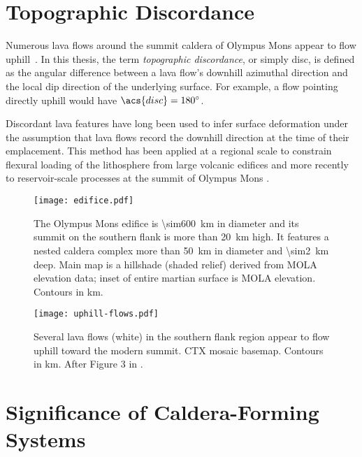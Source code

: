 \section{Topographic Discordance}

Numerous lava flows around the summit caldera of Olympus Mons appear to flow uphill~\parencite[Figure~\ref{fig:uphill-flows}; after][]{mouginis-mark_late-stage_2019}. In this thesis, the term \emph{topographic discordance}, or simply \ac{disc}, is defined as the angular difference between a lava flow's downhill azimuthal direction and the local dip direction of the underlying surface. For example, a flow pointing directly uphill would have $\acs{disc}=\ang{180}$. 

Discordant lava features have long been used to infer surface deformation under the assumption that lava flows record the downhill direction at the time of their emplacement. This method has been applied at a regional scale to constrain flexural loading of the lithosphere from large volcanic edifices \parencite{mouginis-mark_ancient_1982,isherwood_volcanic_2013,chadwick_late_2015} and more recently to reservoir-scale processes at the summit of Olympus Mons \parencite{mouginis-mark_late-stage_2019}.

\begin{figure}
    \centering
    \texttt{[image: edifice.pdf]}
    \caption[Olympus Mons]{The Olympus Mons edifice is \qty{\sim600}{\km} in diameter and its summit on the southern flank is more than \qty{20}{\km} high. It features a nested caldera complex more than \qty{50}{\km} in diameter and \qty{\sim2}{\km} deep. Main map is a hillshade (shaded relief) derived from \acs{MOLA} elevation data; inset of entire martian surface is \acs{MOLA} elevation. Contours in \unit{\km}.}\label{fig:edifice}
\end{figure}

\begin{figure}
    \centering
    \texttt{[image: uphill-flows.pdf]}
    \caption[Discordant lava flows]{Several lava flows (white) in the southern flank region appear to flow uphill toward the modern summit. \acs{CTX} mosaic basemap. Contours in \unit{\km}. After Figure 3 in \textcite{mouginis-mark_late-stage_2019}.}%
    \label{fig:uphill-flows}
\end{figure}

\section{Significance of Caldera-Forming Systems}

